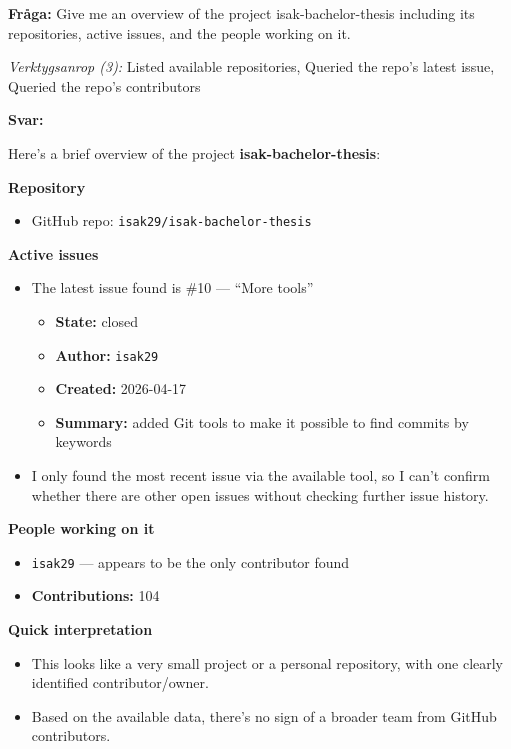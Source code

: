 \textbf{Fråga:} Give me an overview of the project isak-bachelor-thesis including its repositories, active issues, and the people working on it.

\medskip
\textit{Verktygsanrop (3):} Listed available repositories, Queried the repo's latest issue, Queried the repo's contributors

\medskip
\textbf{Svar:}

Here's a brief overview of the project \textbf{isak-bachelor-thesis}:

\textbf{Repository}
\begin{itemize}
    \item GitHub repo: \texttt{isak29/isak-bachelor-thesis}
\end{itemize}

\textbf{Active issues}
\begin{itemize}
    \item The latest issue found is \#10 --- ``More tools''
    \begin{itemize}
        \item \textbf{State:} closed
        \item \textbf{Author:} \texttt{isak29}
        \item \textbf{Created:} 2026-04-17
        \item \textbf{Summary:} added Git tools to make it possible to find commits by keywords
    \end{itemize}
    \item I only found the most recent issue via the available tool, so I can't confirm whether there are other open issues without checking further issue history.
\end{itemize}

\textbf{People working on it}
\begin{itemize}
    \item \texttt{isak29} --- appears to be the only contributor found
    \item \textbf{Contributions:} 104
\end{itemize}

\textbf{Quick interpretation}
\begin{itemize}
    \item This looks like a very small project or a personal repository, with one clearly identified contributor/owner.
    \item Based on the available data, there's no sign of a broader team from GitHub contributors.
\end{itemize}

